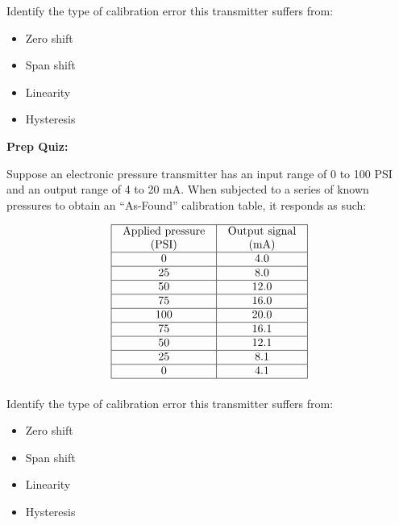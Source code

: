 \documentclass[12pt,a4paper]{article}
\begin{document}
\vskip 10pt

Identify the type of calibration error this transmitter suffers from:

\begin{itemize}
\item{} Zero shift
\vskip 5pt 
\item{} Span shift
\vskip 5pt 
\item{} Linearity
\vskip 5pt 
\item{} Hysteresis
\end{itemize}




\vfil \eject

\noindent
{\bf Prep Quiz:}

Suppose an electronic pressure transmitter has an input range of 0 to 100 PSI and an output range of 4 to 20 mA.  When subjected to a series of known pressures to obtain an ``As-Found'' calibration table, it responds as such:


$$\vbox{\offinterlineskip
\halign{\strut
\vrule \quad\hfil # \ \hfil & 
\vrule \quad\hfil # \ \hfil \vrule \cr
\noalign{\hrule}
%
Applied pressure & Output signal \cr
%
(PSI) & (mA) \cr
%
\noalign{\hrule}
%
0 & 4.0 \cr
%
\noalign{\hrule}
%
25 & 8.0 \cr
%
\noalign{\hrule}
%
50 & 12.0 \cr
%
\noalign{\hrule}
%
75 & 16.0 \cr
%
\noalign{\hrule}
%
100 & 20.0 \cr
%
\noalign{\hrule}
%
75 & 16.1 \cr
%
\noalign{\hrule}
%
50 & 12.1 \cr
%
\noalign{\hrule}
%
25 & 8.1 \cr
%
\noalign{\hrule}
%
0 & 4.1 \cr
%
\noalign{\hrule}
} %
}$$ %

\vskip 10pt

Identify the type of calibration error this transmitter suffers from:

\begin{itemize}
\item{} Zero shift
\vskip 5pt 
\item{} Span shift
\vskip 5pt 
\item{} Linearity
\vskip 5pt 
\item{} Hysteresis
\end{itemize}

\end{document}
